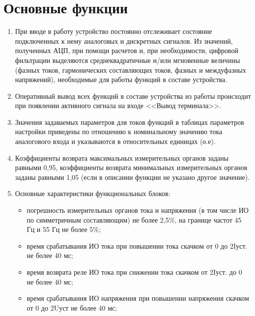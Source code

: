 \color{unimain}\section[Основные функции]{Основные функции}\label{sec:funcs}
\color{black}

\color{black}

\begin{enumerate}[label=\arabic{section}.\arabic{subsection}.\arabic*, labelsep=4pt, leftmargin=0pt, itemindent=57pt]
    
\item
При вводе в работу устройство постоянно отслеживает состояние подключенных к нему аналоговых и дискретных сигналов. Из значений, полученных АЦП, при помощи расчетов и, при необходимости, цифровой фильтрации выделяются среднеквадратичные и/или мгновенные величины (фазных токов, гармонических составляющих токов, фазных и междуфазных напряжений), необходимые для работы функций в составе устройства.
\item
Оперативный вывод всех функций в составе устройства из работы происходит при появлении активного сигнала на входе <<Вывод терминала>>.
\item
Значения задаваемых параметров для токов функций в таблицах параметров настройки приведены по отношению к номинальному значению тока аналогового входа и указываются в относительных единицах (о.е).
\item
Коэффициенты возврата максимальных измерительных органов заданы равными 0,95, коэффициенты возврата минимальных измерительных органов заданы равными 1,05 (если в описании функции не указано другое значение).
\item
Основные характеристики функциональных блоков:
\begin{itemize}
    \item погрешность измерительных органов тока и напряжения (в том числе ИО по симметричным составляющим) не более 2,5\%, на границе частот 45 Гц и 55 Гц не более 5\%;
    \item время срабатывания ИО тока при повышении тока скачком от 0 до 2Iуст. не более 40 мс;
    \item время возврата реле ИО тока при снижении тока скачком от 2Iуст. до 0 не более 40 мс;
    \item время срабатывания ИО напряжения при повышении напряжения скачком от 0 до 2Uуст не более 40 мс;

\end{itemize}
\end{enumerate}
